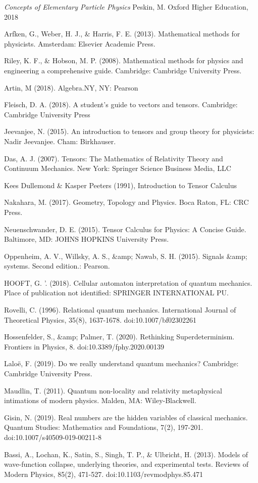 \documentclass[a4paper,12pt]{book}
\begin{document}
\begin{thebibliography}{9}
	 \emph{Concepts of Elementary Particle Physics}
	\newblock Peskin, M.
	\newblock Oxford Higher Education, 2018
	
	  Arfken, G., Weber, H. J., \& Harris, F. E. (2013). Mathematical methods for physicists. Amsterdam: Elsevier Academic Press.
	
	 Riley, K. F., \& Hobson, M. P. (2008). Mathematical methods for physics and engineering a comprehensive guide. Cambridge: Cambridge University Press.
	
	 Artin, M (2018). Algebra.NY, NY: Pearson
	
	 Fleisch, D. A. (2018). A student's guide to vectors and tensors. Cambridge: Cambridge University Press
	
	 Jeevanjee, N. (2015). An introduction to tensors and group theory for physicists: Nadir Jeevanjee. Cham: Birkhauser.
	
	 Das, A. J. (2007). Tensors: The Mathematics of Relativity Theory and Continuum Mechanics. New York: Springer Science Business Media, LLC
	
	  Kees Dullemond \& Kasper Peeters (1991), Introduction to Tensor Calculus 
		
	 Nakahara, M. (2017). Geometry, Topology and Physics. Boca Raton, FL: CRC Press.
	
	 Neuenschwander, D. E. (2015). Tensor Calculus for Physics: A Concise Guide. Baltimore, MD: JOHNS HOPKINS University Press.
	
	  Oppenheim, A. V., Willsky, A. S., \&amp; Nawab, S. H. (2015). Signals \&amp; systems. Second edition.: Pearson.
	
	 HOOFT, G. '. (2018). Cellular automaton interpretation of quantum mechanics. Place of publication not
	 identified: SPRINGER INTERNATIONAL PU.
	 
	  Rovelli, C. (1996). Relational quantum mechanics. International Journal of Theoretical Physics, 35(8), 1637-1678. doi:10.1007/bf02302261
	 
	  Hossenfelder, S., \&amp; Palmer, T. (2020). Rethinking Superdeterminism. Frontiers in Physics, 8. doi:10.3389/fphy.2020.00139
	 
	  Laloë, F. (2019). Do we really understand quantum mechanics? Cambridge: Cambridge University Press.
	 
	  Maudlin, T. (2011). Quantum non-locality and relativity metaphysical intimations of modern physics. Malden, MA: Wiley-Blackwell.
	 
	  Gisin, N. (2019). Real numbers are the hidden variables of classical mechanics. Quantum Studies: Mathematics and Foundations, 7(2), 197-201. doi:10.1007/s40509-019-00211-8
	 
	  Bassi, A., Lochan, K., Satin, S., Singh, T. P., \& Ulbricht, H. (2013). Models of wave-function collapse, underlying theories, and experimental tests. Reviews of Modern Physics, 85(2), 471-527. doi:10.1103/revmodphys.85.471
\end{thebibliography}
\end{document}
